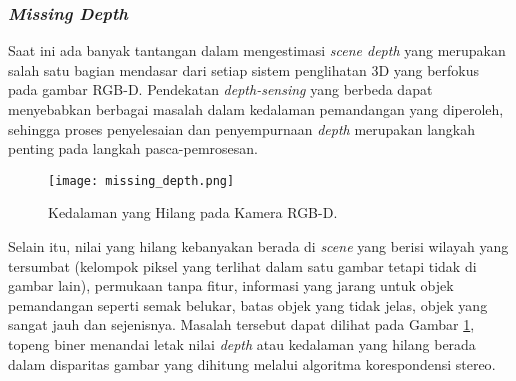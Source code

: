     \subsubsection{\textit{Missing Depth}}
    \label{subsec:missing_depth}
    
    Saat ini ada banyak tantangan dalam mengestimasi \textit{scene depth} yang merupakan salah satu bagian mendasar dari setiap sistem penglihatan 3D yang berfokus pada gambar RGB-D.
    Pendekatan \textit{depth-sensing} yang berbeda dapat menyebabkan berbagai masalah dalam kedalaman pemandangan yang diperoleh, sehingga proses penyelesaian dan penyempurnaan \textit{depth} merupakan langkah penting pada langkah pasca-pemrosesan.
    \begin{figure}[H]
        \centering
        \texttt{[image: missing\_depth.png]}
        \caption{Kedalaman yang Hilang pada Kamera RGB-D\cite{b9}.}
        \label{fig:Ch02_missing_depth}
    \end{figure}

Selain itu, nilai yang hilang kebanyakan berada di \textit{scene} yang berisi wilayah yang tersumbat (kelompok piksel yang terlihat dalam satu gambar tetapi tidak di gambar lain), permukaan tanpa fitur, informasi yang jarang untuk objek pemandangan seperti semak belukar, batas objek yang tidak jelas, objek yang sangat jauh dan sejenisnya. Masalah tersebut dapat dilihat pada Gambar \ref{fig:Ch02_missing_depth}, topeng biner menandai letak nilai \textit{depth} atau kedalaman yang hilang berada dalam disparitas gambar yang dihitung melalui algoritma korespondensi stereo\cite{b9}.  

